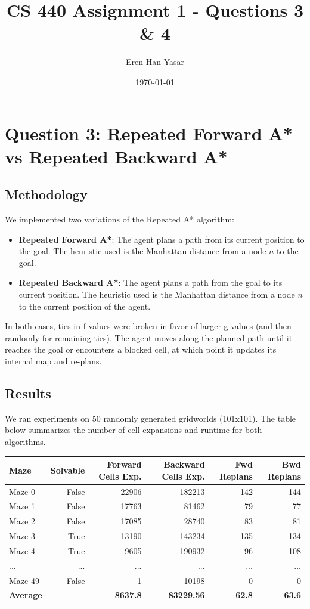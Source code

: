 \documentclass{article}
\title{CS 440 Assignment 1 - Questions 3 \& 4}
\author{Eren Han Yasar}
\date{\today}
\begin{document}
\maketitle

\section*{Question 3: Repeated Forward A* vs Repeated Backward A*}

\subsection*{Methodology}
We implemented two variations of the Repeated A* algorithm:
\begin{itemize}
    \item \textbf{Repeated Forward A*}: The agent plans a path from its current position to the goal. The heuristic used is the Manhattan distance from a node $n$ to the goal. 
    \item \textbf{Repeated Backward A*}: The agent plans a path from the goal to its current position. The heuristic used is the Manhattan distance from a node $n$ to the current position of the agent.
\end{itemize}
In both cases, ties in f-values were broken in favor of larger g-values (and then randomly for remaining ties). The agent moves along the planned path until it reaches the goal or encounters a blocked cell, at which point it updates its internal map and re-plans.

\subsection*{Results}
We ran experiments on 50 randomly generated gridworlds (101x101). The table below summarizes the number of cell expansions and runtime for both algorithms.

\begin{center}
\begin{tabular}{|l|r|r|r|r|r|}
\hline
\textbf{Maze} & \textbf{Solvable} & \textbf{Forward Cells Exp.} & \textbf{Backward Cells Exp.} & \textbf{Fwd Replans} & \textbf{Bwd Replans} \\
\hline
Maze 0  & False & 22906 & 182213 & 142 & 144 \\
Maze 1  & False & 17763 & 81462  & 79  & 77  \\
Maze 2  & False & 17085 & 28740  & 83  & 81  \\
Maze 3  & True  & 13190 & 143234 & 135 & 134 \\
Maze 4  & True  & 9605  & 190932 & 96  & 108 \\
... & ... & ... & ... & ... & ... \\
Maze 49 & False & 1     & 10198  & 0   & 0   \\
\hline
\textbf{Average} & \textbf{---} & \textbf{8637.8} & \textbf{83229.56} & \textbf{62.8} & \textbf{63.6} \\
\hline
\end{tabular}
\end{center}
\end{document}
